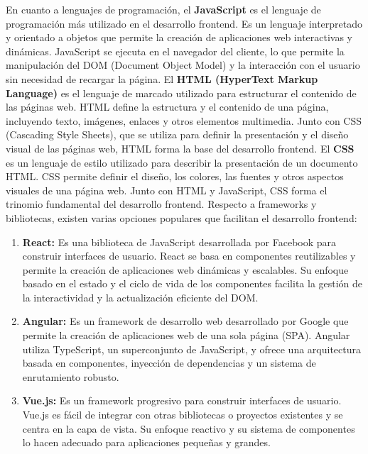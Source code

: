 En cuanto a lenguajes de programación, el \textbf{JavaScript} es el lenguaje de programación más utilizado en el desarrollo frontend. Es un lenguaje interpretado y orientado a objetos que permite la creación de aplicaciones web interactivas y dinámicas. JavaScript se ejecuta en el navegador del cliente, lo que permite la manipulación del DOM (Document Object Model) y la interacción con el usuario sin necesidad de recargar la página.
\newline\newline
El \textbf{HTML (HyperText Markup Language)} es el lenguaje de marcado utilizado para estructurar el contenido de las páginas web. HTML define la estructura y el contenido de una página, incluyendo texto, imágenes, enlaces y otros elementos multimedia. Junto con CSS (Cascading Style Sheets), que se utiliza para definir la presentación y el diseño visual de las páginas web, HTML forma la base del desarrollo frontend.
\newline\newline
El \textbf{CSS} es un lenguaje de estilo utilizado para describir la presentación de un documento HTML. CSS permite definir el diseño, los colores, las fuentes y otros aspectos visuales de una página web. Junto con HTML y JavaScript, CSS forma el trinomio fundamental del desarrollo frontend.
\newline\newline
Respecto a frameworks y bibliotecas, existen varias opciones populares que facilitan el desarrollo frontend:   

\begin{enumerate}
    \item \textbf{React:} Es una biblioteca de JavaScript desarrollada por Facebook para construir interfaces de usuario. React se basa en componentes reutilizables y permite la creación de aplicaciones web dinámicas y escalables. Su enfoque basado en el estado y el ciclo de vida de los componentes facilita la gestión de la interactividad y la actualización eficiente del DOM.
    \item \textbf{Angular:} Es un framework de desarrollo web desarrollado por Google que permite la creación de aplicaciones web de una sola página (SPA). Angular utiliza TypeScript, un superconjunto de JavaScript, y ofrece una arquitectura basada en componentes, inyección de dependencias y un sistema de enrutamiento robusto.
    \item \textbf{Vue.js:} Es un framework progresivo para construir interfaces de usuario. Vue.js es fácil de integrar con otras bibliotecas o proyectos existentes y se centra en la capa de vista. Su enfoque reactivo y su sistema de componentes lo hacen adecuado para aplicaciones pequeñas y grandes.
\end{enumerate}


